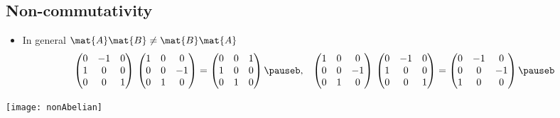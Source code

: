 \begin{slide}
\section[-2]{Non-commutativity}
  
\begin{PauseHighLight}
  \begin{itemize}
  \item In general $\mat{A} \mat{B} \neq \mat{B} \mat{A}$\pause
    {\tiny
      \begin{align*}
      \begin{pmatrix}
        0 & -1 & 0 \\
        1 & 0 & 0 \\
        0 & 0 & 1
      \end{pmatrix} \,
        \begin{pmatrix}
        1 & 0 & 0 \\
        0 & 0 & -1 \\
        0 & 1 & 0
      \end{pmatrix}
                &=
                \begin{pmatrix}
                  0 & 0 & 1 \\
                  1 & 0 & 0 \\
                  0 & 1 &0
                \end{pmatrix}\pauseb
                , &
      \begin{pmatrix}
        1 & 0 & 0 \\
        0 & 0 & -1 \\
        0 & 1 & 0
      \end{pmatrix} \,
      \begin{pmatrix}
        0 & -1 & 0 \\
        1 & 0 & 0 \\
        0 & 0 & 1
      \end{pmatrix}
                &=
                \begin{pmatrix}
                  0 & -1 & 0 \\
                  0 & 0 & -1 \\
                  1 & 0 &0
                \end{pmatrix}\pauseb
      \end{align*}}
  \end{itemize}
\end{PauseHighLight}
\begin{center}
  \texttt{[image: nonAbelian]}\pauseb
\end{center}
\end{slide}


